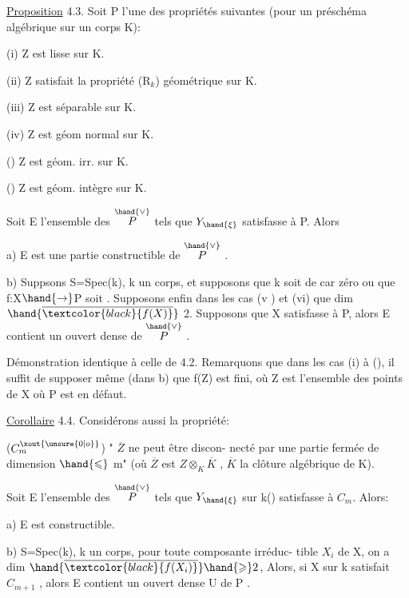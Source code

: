 
\uline{Proposition} 4.3.    Soit P l'une des propriétés  suivantes (pour un
préschéma algébrique sur un corps K):

(i)  Z  est lisse sur K.

(ii)  Z satisfait la propriété (R$_k$) géométrique sur K.

(iii)  Z est séparable sur K.

(iv)  Z est géom normal sur K.

\margin{$\uparrow$}()  Z  est géom. irr.  sur K.

()  Z est géom. intègre  sur K.

Soit E l'ensemble des \hand{$\xi \in$} $\overset{\hand{\vee}}{P}$  tels que $Y_{\hand{\xi}}$ satisfasse à P. Alors

a)  E est une partie constructible de $\overset{\hand{\vee}}{P}$ .

b)  Suppsons  S=Spec(k), k un corps, et supposons  que k soit de
car zéro  ou que f:X$\hand{\rightarrow}$P  soit . Supposons enfin dans les
cas (v ) et (vi)  que dim $\hand{\overline{\textcolor{black}{f(X)}}}$ \over{$\hand{>}$}{$\geqslant$} 2.  Supposons que X satisfasse à P,
alors E contient un ouvert  dense de $\overset{\hand{\vee}}{P}$ .

Démonstration identique à celle de 4.2.   Remarquons que dans
les cas (i) à (), il suffit de supposer même (dans b) que  f(Z) est
fini, où Z est l'ensemble des points de X où  P est en défaut.

\uline{Corollaire} 4.4.    Considérons aussi la propriété:

($C_m^{\xout{\unsure{0|o}}}$)   " $\overline{Z}$ ne peut être discon-%
necté par une partie fermée de dimension  $\hand{\leqslant}$ m" (où $\overline{Z}$ est $Z\otimes_K\overline{K}$ , $\overline{K}$
la clôture  algébrique de K).

Soit E l'ensemble des \hand{$\xi \in$} $\overset{\hand{\vee}}{P}$  tels que  $Y_{\hand{\xi}}$ sur k(\hand{$\xi$}) satisfasse à $C_m$.
Alors:

a)  E est constructible.

b)    S=Spec(k), k un corps,   pour toute composante irréduc-%
tible  $X_i$ de X, on a dim $\hand{\overline{\textcolor{black}{f(X_i)}}} \hand{\geqslant} 2$, Alors, si X sur k satisfait $C_{m+1}$ ,
alors E\hand{$_{\xi}$} contient un ouvert dense U de P .


